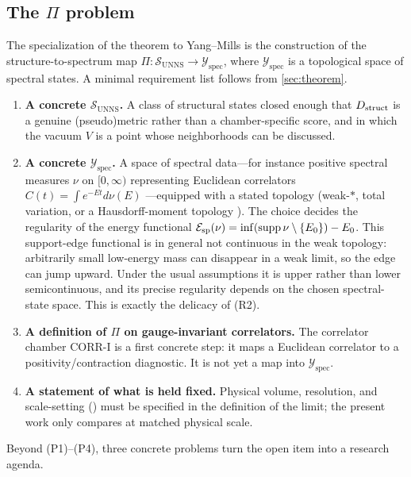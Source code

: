 \documentclass[11pt,a4paper]{article}
\theoremstyle{definition}
\theoremstyle{remark}
\newcommand{\SUNNS}{\mathcal{S}_{\mathrm{UNNS}}}
\newcommand{\Yspec}{\mathcal{Y}_{\mathrm{spec}}}
\begin{document}
\subsection{The \texorpdfstring{$\Pi$}{Pi} problem}\label{ssec:pi}
The specialization of the theorem to Yang--Mills is the construction of the structure-to-spectrum map $\Pi:\SUNNS\to\Yspec$, where $\Yspec$ is a topological space of spectral states. A minimal requirement list follows from \cref{sec:theorem}.

\begin{enumerate}[label=(P\arabic*)]
\item \textbf{A concrete $\SUNNS$.} A class of structural states closed enough that $D_{\rm struct}$ is a genuine (pseudo)metric rather than a chamber-specific score, and in which the vacuum $V$ is a point whose neighborhoods can be discussed.
\item \textbf{A concrete $\Yspec$.} A space of spectral data---for instance positive spectral measures $\nu$ on $[0,\infty)$ representing Euclidean correlators $C(t)=\int e^{-Et}d\nu(E)$ \cite{OS73,OS75,GlimmJaffe}---equipped with a stated topology (weak-$*$, total variation, or a Hausdorff-moment topology \cite{ShohatTamarkin,Akhiezer}). The choice decides the regularity of the energy functional $\mathcal E_{\rm sp}(\nu)=\inf(\mathrm{supp}\,\nu\setminus\{E_0\})-E_0$. This support-edge functional is in general not continuous in the weak topology: arbitrarily small low-energy mass can disappear in a weak limit, so the edge can jump upward. Under the usual assumptions it is upper rather than lower semicontinuous, and its precise regularity depends on the chosen spectral-state space. This is exactly the delicacy of (R2).
\item \textbf{A definition of $\Pi$ on gauge-invariant correlators.} The correlator chamber CORR-I is a first concrete step: it maps a Euclidean correlator to a positivity/contraction diagnostic. It is not yet a map into $\Yspec$.
\item \textbf{A statement of what is held fixed.} Physical volume, resolution, and scale-setting (\cite{Sommer94,LuscherWolff90}) must be specified in the definition of the limit; the present work only compares at matched physical scale.
\end{enumerate}
Beyond (P1)--(P4), three concrete problems turn the open item into a research agenda.
\end{document}

